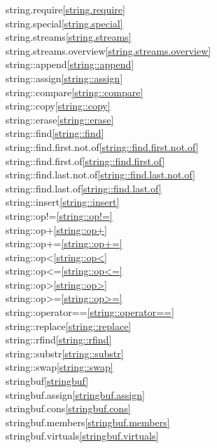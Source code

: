 \begin{multicols}{2}
string.require\quad\ref{string.require}\\
string.special\quad\ref{string.special}\\
string.streams\quad\ref{string.streams}\\
string.streams.overview\quad\ref{string.streams.overview}\\
string::append\quad\ref{string::append}\\
string::assign\quad\ref{string::assign}\\
string::compare\quad\ref{string::compare}\\
string::copy\quad\ref{string::copy}\\
string::erase\quad\ref{string::erase}\\
string::find\quad\ref{string::find}\\
string::find.first.not.of\quad\ref{string::find.first.not.of}\\
string::find.first.of\quad\ref{string::find.first.of}\\
string::find.last.not.of\quad\ref{string::find.last.not.of}\\
string::find.last.of\quad\ref{string::find.last.of}\\
string::insert\quad\ref{string::insert}\\
string::op!=\quad\ref{string::op!=}\\
string::op+\quad\ref{string::op+}\\
string::op+=\quad\ref{string::op+=}\\
string::op<\quad\ref{string::op<}\\
string::op<=\quad\ref{string::op<=}\\
string::op>\quad\ref{string::op>}\\
string::op>=\quad\ref{string::op>=}\\
string::operator==\quad\ref{string::operator==}\\
string::replace\quad\ref{string::replace}\\
string::rfind\quad\ref{string::rfind}\\
string::substr\quad\ref{string::substr}\\
string::swap\quad\ref{string::swap}\\
stringbuf\quad\ref{stringbuf}\\
stringbuf.assign\quad\ref{stringbuf.assign}\\
stringbuf.cons\quad\ref{stringbuf.cons}\\
stringbuf.members\quad\ref{stringbuf.members}\\
stringbuf.virtuals\quad\ref{stringbuf.virtuals}\\

\end{multicols}
